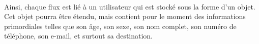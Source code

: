 \paragraph*{}
Ainsi, chaque flux est lié à un utilisateur qui est stocké sous la forme d'un objet. 
Cet objet pourra être étendu, mais contient pour le moment des informations primordiales telles que son âge, son sexe, son nom complet, son numéro de téléphone, son e-mail, et surtout sa destination.

